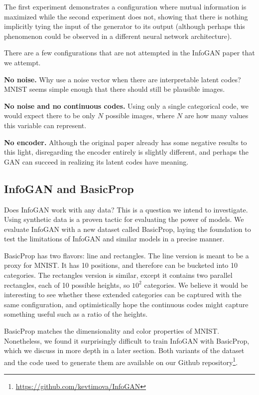 \documentclass{article}
\begin{document}
The first experiment demonstrates a configuration where mutual information is maximized while the second experiment does not, showing that there is nothing implicitly tying the input of the generator to its output (although perhaps this phenomenon could be observed in a different neural network architecture).

There are a few configurations that are not attempted in the InfoGAN paper that we attempt.

\textbf{No noise.} Why use a noise vector when there are interpretable latent codes? MNIST seems simple enough that there should still be plausible images.

\textbf{No noise and no continuous codes.} Using only a single categorical code, we would expect there to be only $N$ possible images, where $N$ are how many values this variable can represent.

\textbf{No encoder.} Although the original paper already has some negative results to this light, disregarding the encoder entirely is slightly different, and perhaps the GAN can succeed in realizing its latent codes have meaning.

\subsection{InfoGAN and BasicProp}

Does InfoGAN work with any data? This is a question we intend to investigate. Using synthetic data is a proven tactic for evaluating the power of models. We evaluate InfoGAN with a new dataset called BasicProp, laying the foundation to test the limitations of InfoGAN and similar models in a precise manner.

BasicProp has two flavors: line and rectangles. The line version is meant to be a proxy for MNIST. It has 10 positions, and therefore can be bucketed into 10 categories. The rectangles version is similar, except it contains two parallel rectangles, each of 10 possible heights, so $10^2$ categories. We believe it would be interesting to see whether these extended categories can be captured with the same configuration, and optimistically hope the continuous codes might capture something useful such as a ratio of the heights.

BasicProp matches the dimensionality and color properties of MNIST. Nonetheless, we found it surprisingly difficult to train InfoGAN with BasicProp, which we discuss in more depth in a later section. Both variants of the dataset and the code used to generate them are available on our Github repository\footnote{\url{https://github.com/kevtimova/InfoGAN}}.
\end{document}
